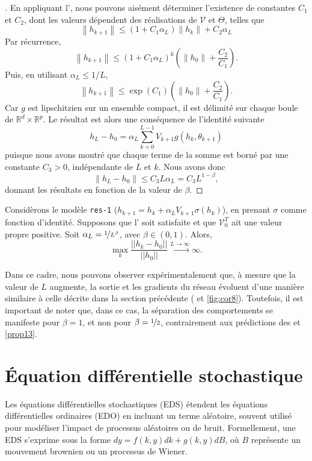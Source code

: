\begin{proof}[]
    En appliquant l', nous pouvons aisément déterminer l'existence de constantes $C_1$ et $C_2$, dont les valeurs dépendent des réalisations de $\mathscr{V}$ et $\Theta$, telles que
    $$
        \left\|h_{k+1}\right\| \leqslant\left(1+C_1 \alpha_L\right)\left\|h_k\right\|+C_2 \alpha_L
    $$
    Par récurrence,
    $$
        \left\|h_{k+1}\right\| \leqslant\left(1+C_1 \alpha_L\right)^k\left(\left\|h_0\right\|+\frac{C_2}{C_1}\right) .
    $$
    Puis, en utilisant $\alpha_L \leqslant 1 / L$,
    $$
        \left\|h_{k+1}\right\| \leqslant \exp \left(C_1\right)\left(\left\|h_0\right\|+\frac{C_2}{C_1}\right) .
    $$
    Car $g$ est lipschitzien sur un ensemble compact, il est délimité sur chaque boule de $\mathbb{R}^d \times \mathbb{R}^p$. Le résultat est alors une conséquence de l'identité suivante
    $$
        h_L-h_0=\alpha_L \sum_{k=0}^{L-1} V_{k+1} g\left(h_k, \theta_{k+1}\right)
    $$
    puisque nous avons montré que chaque terme de la somme est borné par une constante $C_3>0$, indépendante de $L$ et $k$. Nous avons donc 
    $$
        \left\|h_L-h_0\right\| \leqslant C_3 L \alpha_L=C_3 L^{1-\beta},
    $$
    donnant les résultats en fonction de la valeur de $\beta$.
\end{proof}

\begin{proposition}\label{prop13}
    Considèrons le modèle \texttt{res-1} ($h_{k+1} = h_k +\alpha_{L}V_{k+1}\sigma(h_k) $), en prenant $\sigma$ comme fonction d'identité. Supposons que l' soit satisfaite et que $\mathscr{V} _0 ^T$ ait une valeur propre positive. Soit $\alpha_L = \nicefrac{1}{L^{\beta}}$, avec $\beta \in (0,1)$. Alors, 
    \[
        \max_{k}\frac{||h_k-h_0||}{||h_0||} \xrightarrow{L \to \infty } \infty
    .\]
\end{proposition}
Dans ce cadre, nous pouvons observer expérimentalement que, à mesure que la valeur de $L$ augmente, la sortie et les gradients du réseau évoluent d'une manière similaire à celle décrite dans la section précédente ( et \ref{fig:cor8}). Toutefois, il est important de noter que, dans ce cas, la séparation des comportements se manifeste pour $\beta = 1$, et non pour $\beta = \nicefrac{1}{2}$, contrairement aux prédictions des  et \ref{prop13}.

\section{Équation différentielle stochastique}
Les équations différentielles stochastiques (EDS) étendent les équations différentielles ordinaires (EDO) en incluant un terme aléatoire, souvent utilisé pour modéliser l'impact de processus aléatoires ou de bruit. Formellement, une EDS s'exprime sous la forme $dy = f(k,y)dk + g(k,y)dB$, où $B$ représente un mouvement brownien ou un processus de Wiener.

